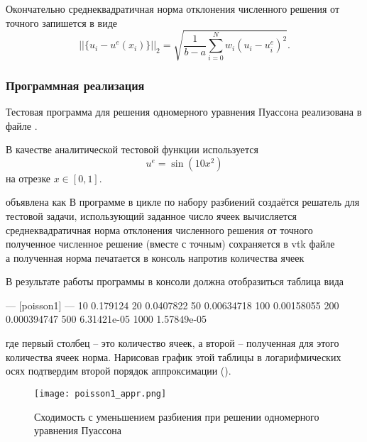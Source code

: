Окончательно среднеквадратичная норма отклонения численного решения от точного запишется в виде
\begin{equation}
    \label{eq:poisson1d_fdm_norm}
    ||\{u_i - u^e(x_i)\}||_2 = \sqrt{\frac{1}{b-a}\sum_{i=0}^{N} w_i \left(u_i - u^e_i\right)^2}.
\end{equation}

\subsubsection{Программная реализация}
\label{sec:poisson1d_prog}


Тестовая программа для решения одномерного уравнения Пуассона 
реализована в файле .

В качестве аналитической тестовой функции  используется
\begin{equation*}
    u^e = \sin(10 x^2)
\end{equation*}
на отрезке $x\in[0,1]$.

объявлена как
В программе в цикле по набору разбиений 
создаётся решатель для тестовой задачи, использующий заданное число ячеек
вычисляется среднеквадратичная норма отклонения численного решения от точного
полученное численное решение (вместе с точным) сохраняется в vtk файле\\
а полученная норма печатается в консоль напротив количества ячеек

В результате работы программы в консоли должна отобразиться таблица вида
\begin{shelloutput}
--- [poisson1] ---
10 0.179124
20 0.0407822
50 0.00634718
100 0.00158055
200 0.000394747
500 6.31421e-05
1000 1.57849e-05
\end{shelloutput}
где первый столбец -- это количество ячеек, а второй -- полученная для этого количества ячеек норма.
Нарисовав график этой таблицы в логарифмических осях подтвердим второй порядок аппроксимации ().

\begin{figure}[h]
\centering
\texttt{[image: poisson1\_appr.png]}
\caption{Сходимость с уменьшением разбиения при решении одномерного уравнения Пуассона}
\label{fig:poisson_convergence}
\end{figure}

